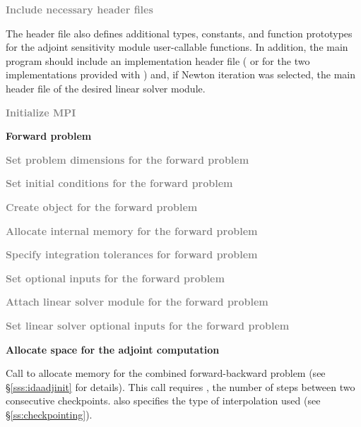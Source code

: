 \begin{Steps}

\item
  \textcolor{gray}{\bf Include necessary header files}
  
  The  header file also defines additional types, constants, and
  function prototypes for the adjoint sensitivity module user-callable functions.
  In addition, the main program should include an {\nvector} 
  implementation header file ( or 
  for the two implementations provided with {\idas}) and, if Newton iteration 
  was selected, the main header file of the desired linear solver module.

\item
  \textcolor{gray}{\bf {\p} Initialize MPI}

  \vspace{0.2in}\centerline{\bf Forward problem}

\item
  \textcolor{gray}{\bf Set problem dimensions for the forward problem}

\item
  \textcolor{gray}{\bf Set initial conditions for the forward problem}

\item
  \textcolor{gray}{\bf Create {\idas} object for the forward problem}

\item
  \textcolor{gray}{\bf Allocate internal memory for the forward problem}

\item
  \textcolor{gray}{\bf Specify integration tolerances for forward problem}

\item
  \textcolor{gray}{\bf Set optional inputs for the forward problem}

\item
  \textcolor{gray}{\bf Attach linear solver module for the forward problem}

\item
  \textcolor{gray}{\bf Set linear solver optional inputs for the forward problem}

\item
  {\bf Allocate space for the adjoint computation}

  Call \id{()} to allocate memory for the 
  combined forward-backward problem (see \S\ref{sss:idaadjinit} for details).
  This call requires , the number of steps between two consecutive checkpoints.
   also specifies the type of interpolation used 
  (see \S\ref{ss:checkpointing}).


\end{Steps}

